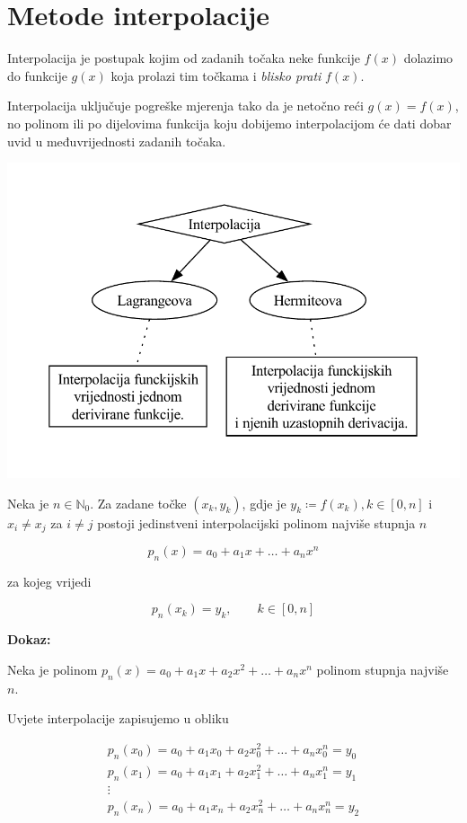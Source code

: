 \section{Metode interpolacije}

Interpolacija je postupak kojim od zadanih točaka neke funkcije $f(x)$ dolazimo
do funkcije $g(x)$ koja prolazi tim točkama i \textit{blisko prati} $f(x)$.

Interpolacija uključuje pogreške mjerenja tako da je netočno reći $g(x) = f(x)$,
no polinom ili po dijelovima funkcija koju dobijemo interpolacijom će dati
dobar uvid u međuvrijednosti zadanih točaka.

\begin{center}
    \includegraphics[width=0.5\linewidth]{interpolation.pdf}
\end{center}

\begin{theorem}
    Neka je $n\in\mathbb{N}_0$. Za zadane točke $(x_k,y_k)$, gdje je $y_k\coloneq f(x_k), k\in[0,n]$ i $x_i\neq x_j$ za $i\neq j$ postoji jedinstveni interpolacijski polinom najviše stupnja $n$

    $$
        p_n(x)=a_0+a_1x+\dots+a_nx^n
    $$

    za kojeg vrijedi

    $$
        p_n(x_k) = y_k,\qquad k\in[0,n]
    $$
\end{theorem}

\textbf{Dokaz:}

\bigskip

Neka je polinom $p_n(x)=a_0+a_1x+a_2x^2+\dots+a_nx^n$ polinom stupnja najviše $n$.

Uvjete interpolacije zapisujemo u obliku

\begin{gather*}
    p_n(x_0)=a_0+a_1x_0+a_2x_0^2+\dots+a_nx_0^n=y_0\\
    p_n(x_1)=a_0+a_1x_1+a_2x_1^2+\dots+a_nx_1^n=y_1\\
    \vdots\\
    p_n(x_n)=a_0+a_1x_n+a_2x_n^2+\dots+a_nx_n^n=y_2
\end{gather*}

